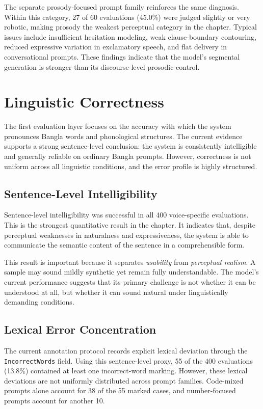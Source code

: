 The separate prosody-focused prompt family reinforces the same diagnosis. Within this category, 27 of 60 evaluations (45.0\%) were judged slightly or very robotic, making prosody the weakest perceptual category in the chapter. Typical issues include insufficient hesitation modeling, weak clause-boundary contouring, reduced expressive variation in exclamatory speech, and flat delivery in conversational prompts. These findings indicate that the model's segmental generation is stronger than its discourse-level prosodic control.

\section{Linguistic Correctness}

The first evaluation layer focuses on the accuracy with which the system pronounces Bangla words and phonological structures. The current evidence supports a strong sentence-level conclusion: the system is consistently intelligible and generally reliable on ordinary Bangla prompts. However, correctness is not uniform across all linguistic conditions, and the error profile is highly structured.

\subsection{Sentence-Level Intelligibility}

Sentence-level intelligibility was successful in all 400 voice-specific evaluations. This is the strongest quantitative result in the chapter. It indicates that, despite perceptual weaknesses in naturalness and expressiveness, the system is able to communicate the semantic content of the sentence in a comprehensible form.

This result is important because it separates \textit{usability} from \textit{perceptual realism}. A sample may sound mildly synthetic yet remain fully understandable. The model's current performance suggests that its primary challenge is not whether it can be understood at all, but whether it can sound natural under linguistically demanding conditions.

\subsection{Lexical Error Concentration}

The current annotation protocol records explicit lexical deviation through the \texttt{IncorrectWords} field. Using this sentence-level proxy, 55 of the 400 evaluations (13.8\%) contained at least one incorrect-word marking. However, these lexical deviations are not uniformly distributed across prompt families. Code-mixed prompts alone account for 38 of the 55 marked cases, and number-focused prompts account for another 10.

